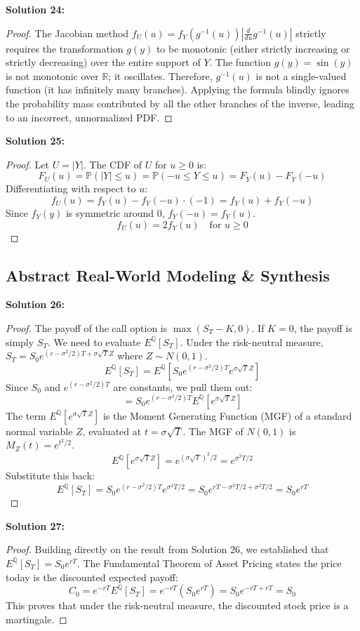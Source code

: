 \documentclass[11pt, a4paper]{article}
\theoremstyle{definition}
\theoremstyle{remark}
\newcommand{\R}{\mathbb{R}}
\newcommand{\Q}{\mathbb{Q}}
\newcommand{\Prob}{\mathbb{P}}
\begin{document}
\textbf{Solution 24:}
\begin{proof}
The Jacobian method $f_U(u) = f_Y(g^{-1}(u)) \left| \frac{d}{du} g^{-1}(u) \right|$ strictly requires the transformation $g(y)$ to be monotonic (either strictly increasing or strictly decreasing) over the entire support of $Y$. 
The function $g(y) = \sin(y)$ is not monotonic over $\R$; it oscillates. Therefore, $g^{-1}(u)$ is not a single-valued function (it has infinitely many branches). Applying the formula blindly ignores the probability mass contributed by all the other branches of the inverse, leading to an incorrect, unnormalized PDF.
\end{proof}

\textbf{Solution 25:}
\begin{proof}
Let $U = |Y|$. The CDF of $U$ for $u \ge 0$ is:
\[ F_U(u) = \Prob(|Y| \le u) = \Prob(-u \le Y \le u) = F_Y(u) - F_Y(-u) \]
Differentiating with respect to $u$:
\[ f_U(u) = f_Y(u) - f_Y(-u) \cdot (-1) = f_Y(u) + f_Y(-u) \]
Since $f_Y(y)$ is symmetric around $0$, $f_Y(-u) = f_Y(u)$.
\[ f_U(u) = 2f_Y(u) \quad \text{for } u \ge 0 \]
\end{proof}

\subsection{Abstract Real-World Modeling \& Synthesis}

\textbf{Solution 26:}
\begin{proof}
The payoff of the call option is $\max(S_T - K, 0)$. If $K=0$, the payoff is simply $S_T$.
We need to evaluate $E^\Q[S_T]$. Under the risk-neutral measure, $S_T = S_0 e^{(r-\sigma^2/2)T + \sigma \sqrt{T} Z}$ where $Z \sim N(0,1)$.
\[ E^\Q[S_T] = E^\Q\left[ S_0 e^{(r-\sigma^2/2)T} e^{\sigma \sqrt{T} Z} \right] \]
Since $S_0$ and $e^{(r-\sigma^2/2)T}$ are constants, we pull them out:
\[ = S_0 e^{(r-\sigma^2/2)T} E^\Q\left[ e^{\sigma \sqrt{T} Z} \right] \]
The term $E^\Q[e^{\sigma \sqrt{T} Z}]$ is the Moment Generating Function (MGF) of a standard normal variable $Z$, evaluated at $t = \sigma \sqrt{T}$. The MGF of $N(0,1)$ is $M_Z(t) = e^{t^2/2}$.
\[ E^\Q\left[ e^{\sigma \sqrt{T} Z} \right] = e^{(\sigma \sqrt{T})^2 / 2} = e^{\sigma^2 T / 2} \]
Substitute this back:
\[ E^\Q[S_T] = S_0 e^{(r-\sigma^2/2)T} e^{\sigma^2 T / 2} = S_0 e^{rT - \sigma^2 T / 2 + \sigma^2 T / 2} = S_0 e^{rT} \]
\end{proof}

\textbf{Solution 27:}
\begin{proof}
Building directly on the result from Solution 26, we established that $E^\Q[S_T] = S_0 e^{rT}$.
The Fundamental Theorem of Asset Pricing states the price today is the discounted expected payoff:
\[ C_0 = e^{-rT} E^\Q[S_T] = e^{-rT} (S_0 e^{rT}) = S_0 e^{-rT + rT} = S_0 \]
This proves that under the risk-neutral measure, the discounted stock price is a martingale.
\end{proof}
\end{document}
